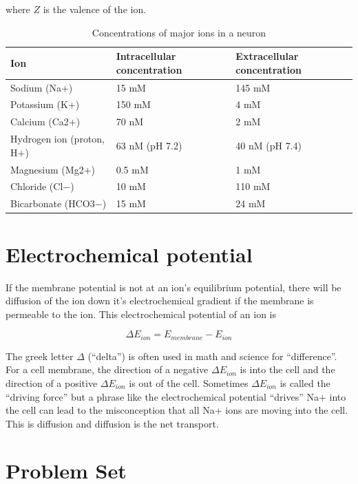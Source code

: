 \documentclass[]{book}
\begin{document}
where \(Z\) is the valence of the ion.

\begin{table}

\caption{\label{tab:unnamed-chunk-1}Concentrations of major ions in a neuron}
\centering
\begin{tabular}[t]{l|l|l}
\hline
Ion & Intracellular concentration & Extracellular concentration\\
\hline
Sodium (Na+) & 15 mM & 145 mM\\
\hline
Potassium (K+) & 150 mM & 4 mM\\
\hline
Calcium (Ca2+) & 70 nM & 2 mM\\
\hline
Hydrogen ion (proton, H+) & 63 nM (pH 7.2) & 40 nM (pH 7.4)\\
\hline
Magnesium (Mg2+) & 0.5 mM & 1 mM\\
\hline
Chloride (Cl−) & 10 mM & 110 mM\\
\hline
Bicarbonate (HCO3−) & 15 mM & 24 mM\\
\hline
\end{tabular}
\end{table}

\section{Electrochemical potential}\label{electrochemical-potential}

If the membrane potential is not at an ion's equilibrium potential,
there will be diffusion of the ion down it's electrochemical gradient if
the membrane is permeable to the ion. This electrochemical potential of
an ion is

\begin{equation}
\Delta E_{ion} = E_{membrane} - E_{ion}
\end{equation}

The greek letter \(\Delta\) (``delta'') is often used in math and
science for ``difference''. For a cell membrane, the direction of a
negative \(\Delta E_{ion}\) is into the cell and the direction of a
positive \(\Delta E_{ion}\) is out of the cell. Sometimes
\(\Delta E_{ion}\) is called the ``driving force'' but a phrase like the
electrochemical potential ``drives'' Na+ into the cell can lead to the
misconception that all Na+ ions are moving into the cell. This is
diffusion and diffusion is the net transport.

\section{Problem Set}\label{problem-set}
\end{document}
